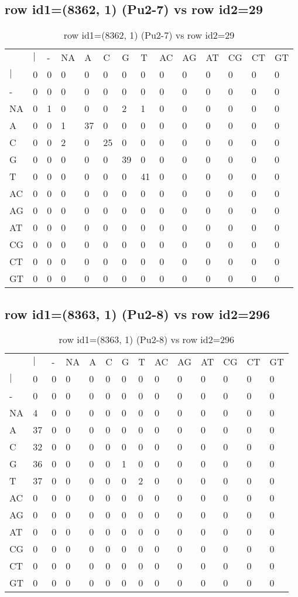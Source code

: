 \subsection{row id1=(8362, 1) (Pu2-7) vs row id2=29}
\begin{center}
\begin{longtable}{|l|l|l|l|l|l|l|l|l|l|l|l|l|l|}
\caption{row id1=(8362, 1) (Pu2-7) vs row id2=29} \label{table_dm388}\\
\hline
\\
\hline
&$|$&-&NA&A&C&G&T&AC&AG&AT&CG&CT&GT\\
$|$&0&0&0&0&0&0&0&0&0&0&0&0&0\\
-&0&0&0&0&0&0&0&0&0&0&0&0&0\\
NA&0&1&0&0&0&2&1&0&0&0&0&0&0\\
A&0&0&1&37&0&0&0&0&0&0&0&0&0\\
C&0&0&2&0&25&0&0&0&0&0&0&0&0\\
G&0&0&0&0&0&39&0&0&0&0&0&0&0\\
T&0&0&0&0&0&0&41&0&0&0&0&0&0\\
AC&0&0&0&0&0&0&0&0&0&0&0&0&0\\
AG&0&0&0&0&0&0&0&0&0&0&0&0&0\\
AT&0&0&0&0&0&0&0&0&0&0&0&0&0\\
CG&0&0&0&0&0&0&0&0&0&0&0&0&0\\
CT&0&0&0&0&0&0&0&0&0&0&0&0&0\\
GT&0&0&0&0&0&0&0&0&0&0&0&0&0\\
\hline
\end{longtable}
\end{center}

\subsection{row id1=(8363, 1) (Pu2-8) vs row id2=296}
\begin{center}
\begin{longtable}{|l|l|l|l|l|l|l|l|l|l|l|l|l|l|}
\caption{row id1=(8363, 1) (Pu2-8) vs row id2=296} \label{table_dm390}\\
\hline
\\
\hline
&$|$&-&NA&A&C&G&T&AC&AG&AT&CG&CT&GT\\
$|$&0&0&0&0&0&0&0&0&0&0&0&0&0\\
-&0&0&0&0&0&0&0&0&0&0&0&0&0\\
NA&4&0&0&0&0&0&0&0&0&0&0&0&0\\
A&37&0&0&0&0&0&0&0&0&0&0&0&0\\
C&32&0&0&0&0&0&0&0&0&0&0&0&0\\
G&36&0&0&0&0&1&0&0&0&0&0&0&0\\
T&37&0&0&0&0&0&2&0&0&0&0&0&0\\
AC&0&0&0&0&0&0&0&0&0&0&0&0&0\\
AG&0&0&0&0&0&0&0&0&0&0&0&0&0\\
AT&0&0&0&0&0&0&0&0&0&0&0&0&0\\
CG&0&0&0&0&0&0&0&0&0&0&0&0&0\\
CT&0&0&0&0&0&0&0&0&0&0&0&0&0\\
GT&0&0&0&0&0&0&0&0&0&0&0&0&0\\
\hline
\end{longtable}
\end{center}

